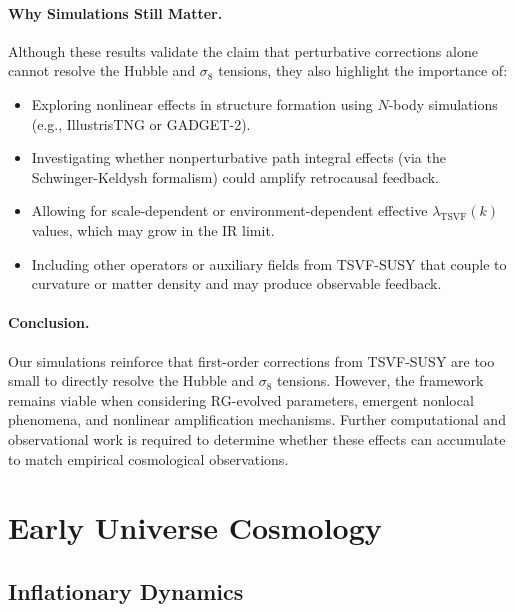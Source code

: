 \documentclass[twocolumn,superscriptaddress,floatfix]{revtex4-2}
\begin{document}
\paragraph{Why Simulations Still Matter.}
Although these results validate the claim that perturbative corrections alone cannot resolve the Hubble and \(\sigma_8\) tensions, they also highlight the importance of:
\begin{itemize}
    \item Exploring nonlinear effects in structure formation using \(N\)-body simulations (e.g., IllustrisTNG or GADGET-2).
    \item Investigating whether nonperturbative path integral effects (via the Schwinger-Keldysh formalism) could amplify retrocausal feedback.
    \item Allowing for scale-dependent or environment-dependent effective \(\lambda_{\text{TSVF}}(k)\) values, which may grow in the IR limit.
    \item Including other operators or auxiliary fields from TSVF-SUSY that couple to curvature or matter density and may produce observable feedback.
\end{itemize}

\paragraph{Conclusion.}
Our simulations reinforce that first-order corrections from TSVF-SUSY are too small to directly resolve the Hubble and \(\sigma_8\) tensions. However, the framework remains viable when considering RG-evolved parameters, emergent nonlocal phenomena, and nonlinear amplification mechanisms. Further computational and observational work is required to determine whether these effects can accumulate to match empirical cosmological observations.


\section{Early Universe Cosmology}  
\label{sec:early_universe}  

\subsection{Inflationary Dynamics}  
\label{subsec:inflation}  
\end{document}
